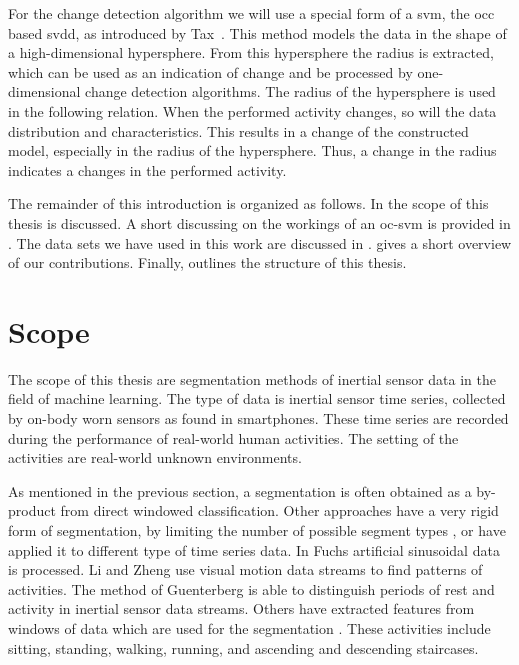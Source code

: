For the change detection algorithm we will use a special form of a \gls{svm}, the \gls{occ} based \gls{svdd}, as introduced by Tax~\cite{tax2001one}.
This method models the data in the shape of a high-dimensional hypersphere.
From this hypersphere the radius is extracted, which can be used as an indication of change and be processed by one-dimensional change detection algorithms.
The radius of the hypersphere is used in the following relation.
When the performed activity changes, so will the data distribution and characteristics.
This results in a change of the constructed model, especially in the radius of the hypersphere.
Thus, a change in the radius indicates a changes in the performed activity.

The remainder of this introduction is organized as follows.
In  the scope of this thesis is discussed.
A short discussing on the workings of an \acrlong{oc-svm} is provided in .
The data sets we have used in this work are discussed in .
 gives a short overview of our contributions.
Finally,  outlines the structure of this thesis.

\section{Scope}\label{sec:intro_scope}
The scope of this thesis are segmentation methods of inertial sensor data in the field of machine learning.
The type of data is inertial sensor time series, collected by on-body worn sensors as found in smartphones.
These time series are recorded during the performance of real-world human activities.
The setting of the activities are real-world unknown environments.

As mentioned in the previous section, a segmentation is often obtained as a by-product from direct windowed classification.
Other approaches have a very rigid form of segmentation, \eg by limiting the number of possible segment types \cite{himberg2001time,chamroukhi2013joint}, or have applied it to different type of time series data.
In Fuchs \etal \cite{fuchs2010online} artificial sinusoidal data is processed.
Li and Zheng \cite{li2007segmentation} use visual motion data streams to find patterns of activities.
The method of Guenterberg \etal \cite{guenterberg2009automatic} is able to distinguish periods of rest and activity in inertial sensor data streams.
Others have extracted features from windows of data which are used for the segmentation \cite{guo2012adaptive}.
These activities include sitting, standing, walking, running, and ascending and descending staircases.

